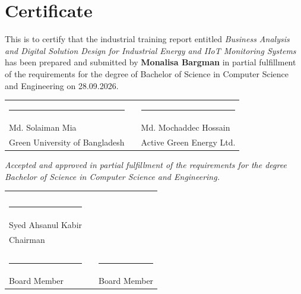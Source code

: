 \chapter*{\centering Certificate}

This is to certify that the industrial training report entitled \textit{Business Analysis and Digital Solution Design for Industrial Energy and IIoT Monitoring Systems} has been prepared and submitted by \textbf{Monalisa Bargman} in partial fulfillment of the requirements for the degree of Bachelor of Science in Computer Science and Engineering on 28.09.2026.

\bigskip
\bigskip
\bigskip
\bigskip

\noindent
\begin{tabular}{p{7cm} p{2cm} p{7cm}}
  \rule{6cm}{1pt} & & \rule{5cm}{1pt} \\
  Md. Solaiman Mia  & & Md. Mochaddec Hossain \\
  Green University of Bangladesh & & Active Green Energy Ltd. \\
\end{tabular}

\bigskip
\noindent
\begin{center}
    \vspace{0.5cm}
    \textit{Accepted and approved in partial fulfillment of the requirements for the degree\\
    Bachelor of Science in Computer Science and Engineering.}
    \vspace{0.5cm}
\end{center}

\noindent
\begin{tabular}{p{6cm} p{3cm} p{6cm}}
  &  &  \\
  &  &  \\
  \rule{6cm}{1pt} &  & \\
  Syed Ahsanul Kabir \\
  Chairman \\ \\
  &  &  \\
  \rule{5cm}{1pt} &  & \rule{5cm}{1pt} \\
  Board Member & & Board Member \\
\end{tabular}
